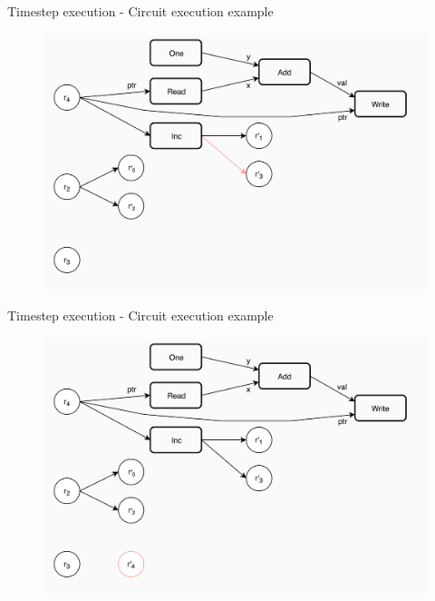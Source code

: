 \documentclass[xcolor={usenames}]{beamer}
\begin{document}
  \begin{frame}{Timestep execution - Circuit execution example}
  	\begin{figure}
  		\centering
  		\includegraphics[width=\textwidth]{../figures/example-circuit-19.png}
  	\end{figure}
  \end{frame}
  \begin{frame}{Timestep execution - Circuit execution example}
  	\begin{figure}
  		\centering
  		\includegraphics[width=\textwidth]{../figures/example-circuit-20.png}
  	\end{figure}
  \end{frame}
\end{document}

